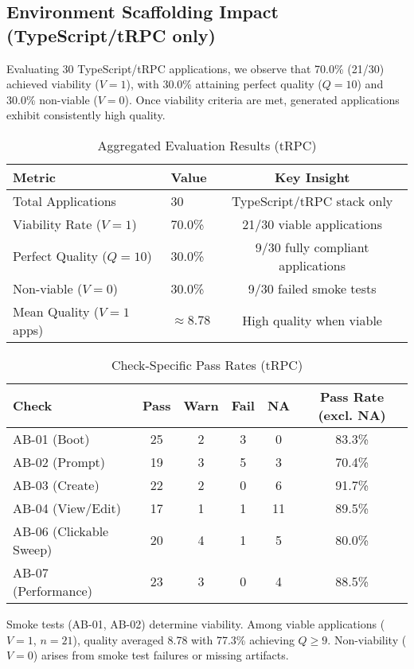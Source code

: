 \documentclass{article}
\begin{document}
\subsection{Environment Scaffolding Impact (TypeScript/tRPC only)}

Evaluating 30 TypeScript/tRPC applications, we observe that 70.0\% (21/30) achieved viability ($V=1$), with 30.0\% attaining perfect quality ($Q=10$) and 30.0\% non-viable ($V=0$). Once viability criteria are met, generated applications exhibit consistently high quality.

\begin{table}[t]
\caption{Aggregated Evaluation Results (tRPC)}
\label{tab:aggregated-results}
\centering
\begin{tabular}{llc}
\toprule
Metric & Value & Key Insight \\
\midrule
Total Applications & 30 & TypeScript/tRPC stack only \\
Viability Rate ($V=1$) & 70.0\% & 21/30 viable applications \\
Perfect Quality ($Q=10$) & 30.0\% & 9/30 fully compliant applications \\
Non-viable ($V=0$) & 30.0\% & 9/30 failed smoke tests \\
Mean Quality ($V=1$ apps) & $\approx 8.78$ & High quality when viable \\
\bottomrule
\end{tabular}
\end{table}

\begin{table}[t]
\caption{Check-Specific Pass Rates (tRPC)}
\label{tab:check-pass-rates}
\centering
\begin{tabular}{lccccc}
\toprule
Check & Pass & Warn & Fail & NA & Pass Rate (excl. NA) \\
\midrule
AB-01 (Boot) & 25 & 2 & 3 & 0 & 83.3\% \\
AB-02 (Prompt) & 19 & 3 & 5 & 3 & 70.4\% \\
AB-03 (Create) & 22 & 2 & 0 & 6 & 91.7\% \\
AB-04 (View/Edit) & 17 & 1 & 1 & 11 & 89.5\% \\
AB-06 (Clickable Sweep) & 20 & 4 & 1 & 5 & 80.0\% \\
AB-07 (Performance) & 23 & 3 & 0 & 4 & 88.5\% \\
\bottomrule
\end{tabular}
\end{table}

Smoke tests (AB-01, AB-02) determine viability. Among viable applications ($V=1$, $n=21$), quality averaged 8.78 with 77.3\% achieving $Q \geq 9$. Non-viability ($V=0$) arises from smoke test failures or missing artifacts.
\end{document}

